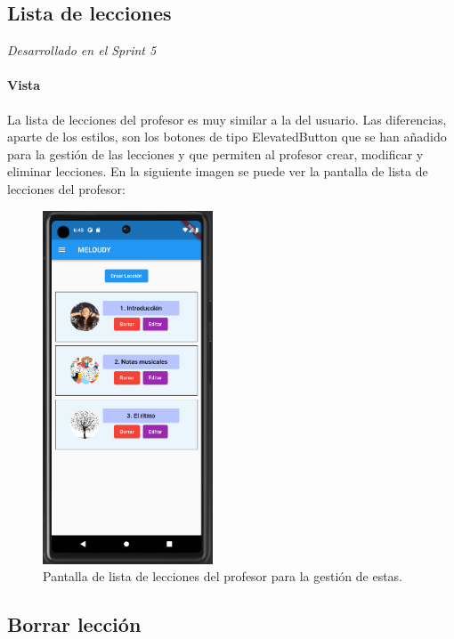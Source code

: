 \newpage

\subsection{Lista de lecciones} 
\textit{Desarrollado en el Sprint 5}

\paragraph*{Vista}
La lista de lecciones del profesor es muy similar a la del usuario. Las diferencias, aparte de los estilos, son los botones de tipo ElevatedButton que se han añadido para la gestión de las lecciones y que permiten al profesor crear, modificar y eliminar lecciones. En la siguiente imagen se puede ver la pantalla de lista de lecciones del profesor:

\begin{figure}[H]
  \centering
  \includegraphics[width=0.45\textwidth]{imagenes/c7/listalecciones.png}
  \caption{Pantalla de lista de lecciones del profesor para la gestión de estas.} 
  \label{fig:login}
\end{figure}

\newpage

\subsection{Borrar lección} 

